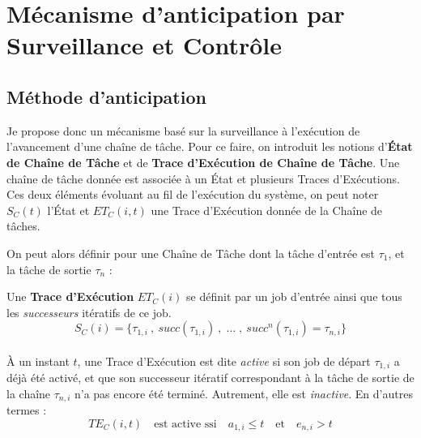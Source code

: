 \documentclass[french, a4paper, 11pt, twoside, pdftex]{StyleThese}
\begin{document}
    
\section{Mécanisme d'anticipation par Surveillance et Contrôle}
    \subsection{Méthode d'anticipation}
    
    Je propose donc un mécanisme basé sur la surveillance à l'exécution de l'avancement d'une chaîne de tâche. 
    Pour ce faire, on introduit les notions d'\textbf{État de Chaîne de Tâche} et de \textbf{Trace d'Exécution de Chaîne de Tâche}. Une chaîne de tâche donnée est associée à un État et plusieurs Traces d'Exécutions. Ces deux éléments évoluant au fil de l'exécution du système, on peut noter $S_C(t)$ l'État et $ET_C(i,t)$ une Trace d'Exécution donnée de la Chaîne de tâches.
    
    On peut alors définir pour une Chaîne de Tâche dont la tâche d'entrée est $\tau_{1}$, et la tâche de sortie $\tau_{n}$ : 
    \begin{definition} \label{def:TraceExecutionChaine}
    	Une \textbf{Trace d'Exécution} $ET_C(i)$ se définit par un job d'entrée ainsi que tous les \textit{successeurs} itératifs de ce job. \\
    	\begin{equation*}
    		S_C(i) = \{ \tau_{1,i} \:,\: succ(\tau_{1,i})\:, \;\dots\; ,\: succ^n(\tau_{1,i}) = \tau_{n,i} \}
    	\end{equation*} \\    	
    	À un instant $t$, une Trace d'Exécution est dite \emph{active} si son job de départ $\tau_{1,i}$ a déjà été activé, et que son successeur itératif correspondant à la tâche de sortie de la chaîne $\tau_{n,i}$ n'a pas encore été terminé. Autrement, elle est \textit{inactive}. En d'autres termes : \\
    	\begin{equation*}
    		TE_C(i,t)  \quad \textrm{est active ssi}\quad  a_{1,i} \leq t \quad \textrm{et} \quad e_{n,i} > t
    	\end{equation*} 
    \end{definition}
    
    
\end{document}
